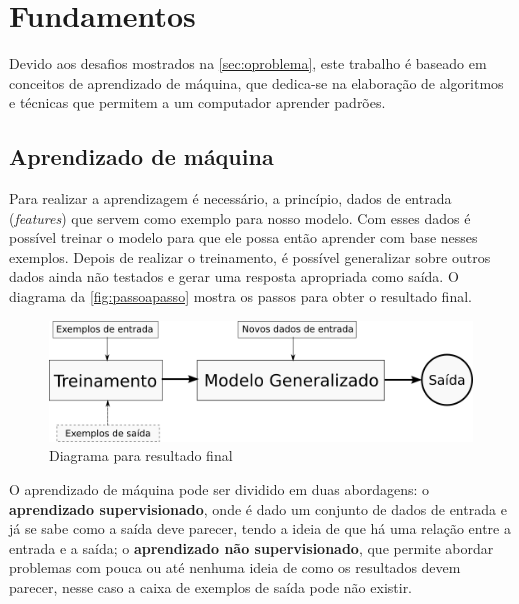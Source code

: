 \chapter{Fundamentos}\label{fundamentos}

Devido aos desafios mostrados na \autoref{sec:oproblema}, este trabalho é baseado em conceitos de aprendizado de máquina, que dedica-se na elaboração de algoritmos e técnicas que permitem a um computador aprender padrões.  

\section{Aprendizado de máquina}\label{sec:aprendizadodemaquina}

Para realizar a aprendizagem é necessário, a princípio, dados de entrada (\textit{features}) que servem como exemplo para nosso modelo. Com esses dados é possível treinar o modelo para que ele possa então aprender com base nesses exemplos. Depois de realizar o treinamento, é possível generalizar sobre outros dados ainda não testados e gerar uma resposta apropriada como saída. O diagrama da \autoref{fig:passoapasso} mostra os passos para obter o resultado final.

\begin{figure}[htb]
	  \caption{Diagrama para resultado final}\label{fig:passoapasso}
	  \begin{center}
	      \includegraphics[scale=0.5]{img/passoapasso}
	  \end{center}
\end{figure}


O aprendizado de máquina pode ser dividido em duas abordagens: o \textbf{aprendizado supervisionado}, onde é dado um conjunto de dados de entrada e já se sabe como a saída deve parecer, tendo a ideia de que há uma relação entre a entrada e a saída; o \textbf{aprendizado não supervisionado}, que permite abordar problemas com pouca ou até nenhuma ideia de como os resultados devem parecer, nesse caso a caixa de exemplos de saída pode não existir.

